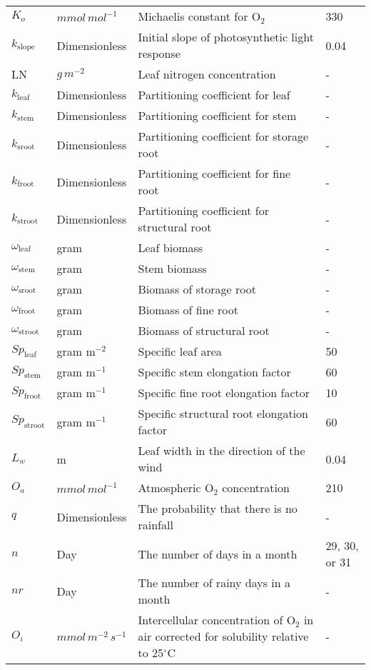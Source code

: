 \documentclass[12pt]{report}
\begin{document}
\begin{center}
\begin{longtable}{l l p{3in} p{0.5in}}
$K_{o}$	&	$mmol\, mol^{-1}$	&	Michaelis constant for O$_{2}$ 	&	330	\\
$k_{\text{slope}}$	&	Dimensionless	&	Initial slope of photosynthetic light response	&	0.04	\\
LN	&	$g\, m^{-2}$ 	&	Leaf nitrogen concentration	&	-	\\
$k_{\text{leaf}}$	&	Dimensionless	&	Partitioning coefficient for leaf	&	-	\\
$k_{\text{stem}}$	&	Dimensionless	&	Partitioning coefficient for stem	&	-	\\
$k_{\text{sroot}}$	&	Dimensionless	&	Partitioning coefficient for storage root	&	-	\\
$k_{\text{froot}}$	&	Dimensionless	&	Partitioning coefficient for fine root	&	-	\\
$k_{\text{stroot}}$	&	Dimensionless	&	Partitioning coefficient for structural root	&	-	\\
$\omega_{\text{leaf}}$	&	gram	&	Leaf biomass	&	-	\\
$\omega_{\text{stem}}$	&	gram	&	Stem biomass	&	-	\\
$\omega_{\text{sroot}}$	&	gram	&	Biomass of storage root	&	-	\\
$\omega_{\text{froot}}$	&	gram	&	Biomass of fine root	&	-	\\
$\omega_{\text{stroot}}$	&	gram	&	Biomass of structural root	&	-	\\
$Sp_{\text{leaf}}$	&	gram m$^{-2}$ 	&	Specific leaf area	&	50	\\
$Sp_{\text{stem}}$	&	gram m$^{-1}$ 	&	Specific stem elongation factor	&	60	\\
$Sp_{\text{froot}}$	&	gram m$^{-1}$	&	Specific fine root elongation factor	&	10	\\
$Sp_{\text{stroot}}$	&	gram m$^{-1}$	&	Specific structural root elongation factor	&	60	\\
$L_w$	&	m	&	Leaf width in the direction of the wind	&	0.04	\\
$O_a$	&	$mmol\, mol^{-1}$	&	Atmospheric O$_2$ concentration	&	210	\\
$q$	&	Dimensionless	&	The probability that there is no rainfall	&	-	\\
$n$	&	Day	&	The number of days in a month	&	29, 30, or 31	\\
$nr$	&	Day 	&	The number of rainy days in a month	&	-	\\
$O_i$	&	$mmol\, m^{-2}\,s^{-1}$	&	Intercellular concentration of O$_2$ in air corrected for solubility relative to 25$^\circ$C	&	-	\\

\end{longtable}
\end{center}
\end{document}
